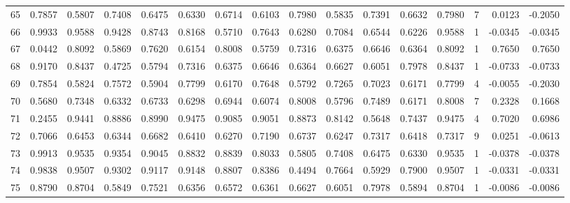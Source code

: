 \begin{tabular}{lrrrrrrrrrrrrrrr}
65  &      0.7857 &  0.5807 &  0.7408 &  0.6475 &  0.6330 &  0.6714 &  0.6103 &  0.7980 &  0.5835 &  0.7391 &   0.6632 &     0.7980 &      7 &                    0.0123 &                    -0.2050 \\
66  &      0.9933 &  0.9588 &  0.9428 &  0.8743 &  0.8168 &  0.5710 &  0.7643 &  0.6280 &  0.7084 &  0.6544 &   0.6226 &     0.9588 &      1 &                   -0.0345 &                    -0.0345 \\
67  &      0.0442 &  0.8092 &  0.5869 &  0.7620 &  0.6154 &  0.8008 &  0.5759 &  0.7316 &  0.6375 &  0.6646 &   0.6364 &     0.8092 &      1 &                    0.7650 &                     0.7650 \\
68  &      0.9170 &  0.8437 &  0.4725 &  0.5794 &  0.7316 &  0.6375 &  0.6646 &  0.6364 &  0.6627 &  0.6051 &   0.7978 &     0.8437 &      1 &                   -0.0733 &                    -0.0733 \\
69  &      0.7854 &  0.5824 &  0.7572 &  0.5904 &  0.7799 &  0.6170 &  0.7648 &  0.5792 &  0.7265 &  0.7023 &   0.6171 &     0.7799 &      4 &                   -0.0055 &                    -0.2030 \\
70  &      0.5680 &  0.7348 &  0.6332 &  0.6733 &  0.6298 &  0.6944 &  0.6074 &  0.8008 &  0.5796 &  0.7489 &   0.6171 &     0.8008 &      7 &                    0.2328 &                     0.1668 \\
71  &      0.2455 &  0.9441 &  0.8886 &  0.8990 &  0.9475 &  0.9085 &  0.9051 &  0.8873 &  0.8142 &  0.5648 &   0.7437 &     0.9475 &      4 &                    0.7020 &                     0.6986 \\
72  &      0.7066 &  0.6453 &  0.6344 &  0.6682 &  0.6410 &  0.6270 &  0.7190 &  0.6737 &  0.6247 &  0.7317 &   0.6418 &     0.7317 &      9 &                    0.0251 &                    -0.0613 \\
73  &      0.9913 &  0.9535 &  0.9354 &  0.9045 &  0.8832 &  0.8839 &  0.8033 &  0.5805 &  0.7408 &  0.6475 &   0.6330 &     0.9535 &      1 &                   -0.0378 &                    -0.0378 \\
74  &      0.9838 &  0.9507 &  0.9302 &  0.9117 &  0.9148 &  0.8807 &  0.8386 &  0.4494 &  0.7664 &  0.5929 &   0.7900 &     0.9507 &      1 &                   -0.0331 &                    -0.0331 \\
75  &      0.8790 &  0.8704 &  0.5849 &  0.7521 &  0.6356 &  0.6572 &  0.6361 &  0.6627 &  0.6051 &  0.7978 &   0.5894 &     0.8704 &      1 &                   -0.0086 &                    -0.0086 \\

\end{tabular}
